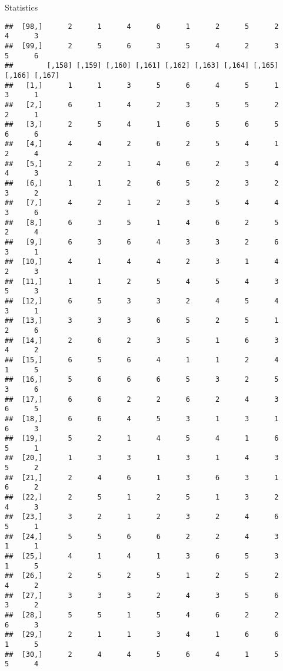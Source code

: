 \documentclass[
  ignorenonframetext,
]{beamer}
\begin{document}
\begin{frame}[fragile]{Statistics}
\begin{verbatim}
##  [98,]      2      1      4      6      1      2      5      2      4      3
##  [99,]      2      5      6      3      5      4      2      3      5      6
##        [,158] [,159] [,160] [,161] [,162] [,163] [,164] [,165] [,166] [,167]
##   [1,]      1      1      3      5      6      4      5      1      3      1
##   [2,]      6      1      4      2      3      5      5      2      2      1
##   [3,]      2      5      4      1      6      5      6      5      6      6
##   [4,]      4      4      2      6      2      5      4      1      2      4
##   [5,]      2      2      1      4      6      2      3      4      4      3
##   [6,]      1      1      2      6      5      2      3      2      3      2
##   [7,]      4      2      1      2      3      5      4      4      3      6
##   [8,]      6      3      5      1      4      6      2      5      2      4
##   [9,]      6      3      6      4      3      3      2      6      3      1
##  [10,]      4      1      4      4      2      3      1      4      2      3
##  [11,]      1      1      2      5      4      5      4      3      5      3
##  [12,]      6      5      3      3      2      4      5      4      3      1
##  [13,]      3      3      3      6      5      2      5      1      2      6
##  [14,]      2      6      2      3      5      1      6      3      4      2
##  [15,]      6      5      6      4      1      1      2      4      1      5
##  [16,]      5      6      6      6      5      3      2      5      3      6
##  [17,]      6      6      2      2      6      2      4      3      6      5
##  [18,]      6      6      4      5      3      1      3      1      6      3
##  [19,]      5      2      1      4      5      4      1      6      5      1
##  [20,]      1      3      3      1      3      1      4      3      5      2
##  [21,]      2      4      6      1      3      6      3      1      6      2
##  [22,]      2      5      1      2      5      1      3      2      4      3
##  [23,]      3      2      1      2      3      2      4      6      5      1
##  [24,]      5      5      6      6      2      2      4      3      1      1
##  [25,]      4      1      4      1      3      6      5      3      1      5
##  [26,]      2      5      2      5      1      2      5      2      4      2
##  [27,]      3      3      3      2      4      3      5      6      3      2
##  [28,]      5      5      1      5      4      6      2      2      6      3
##  [29,]      2      1      1      3      4      1      6      6      1      5
##  [30,]      2      4      4      5      6      4      1      5      5      4

\end{verbatim}
\end{frame}
\end{document}
